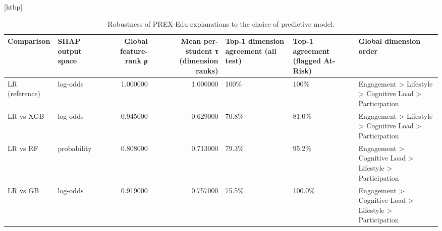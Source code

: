 \begin{table}
\small[htbp]
\caption{Robustness of PREX-Edu explanations to the choice of predictive model.}
\label{tab:S25_crossmodel_prex}
\begin{tabular}{llrrlll}
\toprule
Comparison & SHAP output space & Global feature-rank ρ & Mean per-student τ (dimension ranks) & Top-1 dimension agreement (all test) & Top-1 agreement (flagged At-Risk) & Global dimension order \\
\midrule
LR (reference) & log-odds & 1.000000 & 1.000000 & 100\% & 100\% & Engagement > Lifestyle > Cognitive Load > Participation \\
LR vs XGB & log-odds & 0.945000 & 0.629000 & 70.8\% & 81.0\% & Engagement > Lifestyle > Cognitive Load > Participation \\
LR vs RF & probability & 0.808000 & 0.713000 & 79.3\% & 95.2\% & Engagement > Cognitive Load > Lifestyle > Participation \\
LR vs GB & log-odds & 0.919000 & 0.757000 & 75.5\% & 100.0\% & Engagement > Cognitive Load > Lifestyle > Participation \\
\bottomrule
\end{tabular}
\end{table}
